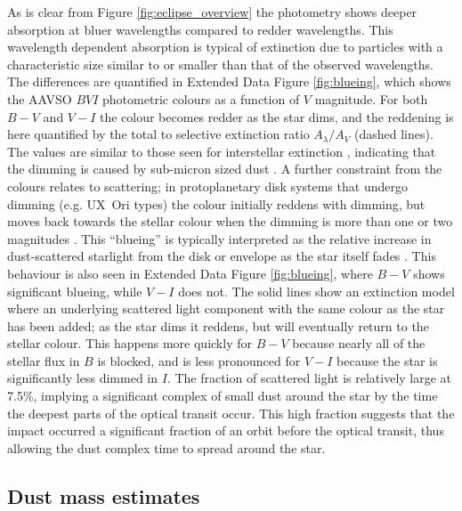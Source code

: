 \documentclass[sn-nature]{sn-jnl}%
\begin{document}
As is clear from Figure \ref{fig:eclipse_overview} the photometry shows deeper absorption at bluer wavelengths compared to redder wavelengths.
%
This wavelength dependent absorption is typical of extinction due to particles with a characteristic size similar to or smaller than that of the observed wavelengths.
%
The differences are quantified in Extended Data Figure \ref{fig:blueing}, which shows the AAVSO $BVI$ photometric colours as a function of $V$ magnitude.
%
For both $B-V$ and $V-I$ the colour becomes redder as the star dims, and the reddening is here quantified by the total to selective extinction ratio $A_\lambda/A_V$ (dashed lines).
%
The values are similar to those seen for interstellar extinction \cite{1989ApJ...345..245C}, indicating that the dimming is caused by sub-micron sized dust \cite{1977ApJ...217..425M,2001ApJ...548..296W}.
%
A further constraint from the colours relates to scattering; in protoplanetary disk systems that undergo dimming (e.g. UX~Ori types) the colour initially reddens with dimming, but moves back towards the stellar colour when the dimming is more than one or two magnitudes \cite[e.g.][]{1994AJ....108.1906H}.
%
This ``blueing'' is typically interpreted as the relative increase in dust-scattered starlight from the disk or envelope as the star itself fades \cite{1988SvAL...14...27G}.
%
This behaviour is also seen in Extended Data Figure \ref{fig:blueing}, where $B-V$ shows significant blueing, while $V-I$ does not.
%
The solid lines show an extinction model where an underlying scattered light component with the same colour as the star has been added; as the star dims it reddens, but will eventually return to the stellar colour.
%
This happens more quickly for $B-V$ because nearly all of the stellar flux in $B$ is blocked, and is less pronounced for $V-I$ because the star is significantly less dimmed in $I$. The fraction of scattered light is relatively large at 7.5\%, implying a significant complex of small dust around the star by the time the deepest parts of the optical transit occur. This high fraction suggests that the impact occurred a significant fraction of an orbit before the optical transit, thus allowing the dust complex time to spread around the star.

\subsection*{Dust mass estimates}
\end{document}
